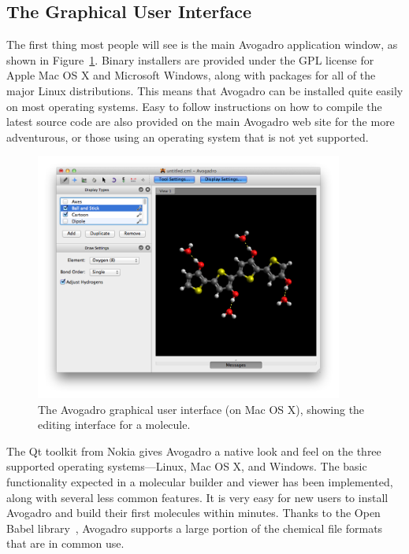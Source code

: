 \documentclass[10pt]{bmc_article}
\newenvironment{bmcformat}{\begin{raggedright}
\baselineskip20pt\sloppy\setboolean{publ}{false}}{\end{raggedright}
\baselineskip20pt\sloppy}
\begin{document}
\begin{bmcformat}
\section{The Graphical User Interface}

The first thing most people will see is the main Avogadro application
window, as shown in Figure~\ref{f:avogadrogui}.
Binary installers are provided under the GPL license for Apple Mac OS X and
Microsoft Windows, along with packages for all of the major Linux distributions.
This means that Avogadro can be installed quite easily on most operating
systems. Easy to follow instructions on how to compile the latest source code
are also provided on the main Avogadro web
site\cite{CompileWindows,CompileLinux} for the more adventurous,
or those using an operating system that is not yet supported.

\begin{figure}
  \begin{center}
    \includegraphics[width=0.9\textwidth]{images/avogadro-drawing}
  \end{center}
  \caption{The Avogadro graphical user interface (on Mac OS X), showing the
editing interface
for a molecule.}
  \label{f:avogadrogui}
\end{figure}

The Qt toolkit from Nokia gives Avogadro a native look and feel on the three
supported operating systems---Linux, Mac OS X, and Windows. The basic
functionality expected in a molecular builder and viewer has been implemented,
along with several less common features. It is very easy for new users to
install Avogadro and build their
first molecules within minutes. Thanks to the Open Babel library~\cite{OpenBabel}, Avogadro
supports a large portion of the chemical file formats that are in
common use.


\end{bmcformat}
\end{document}
